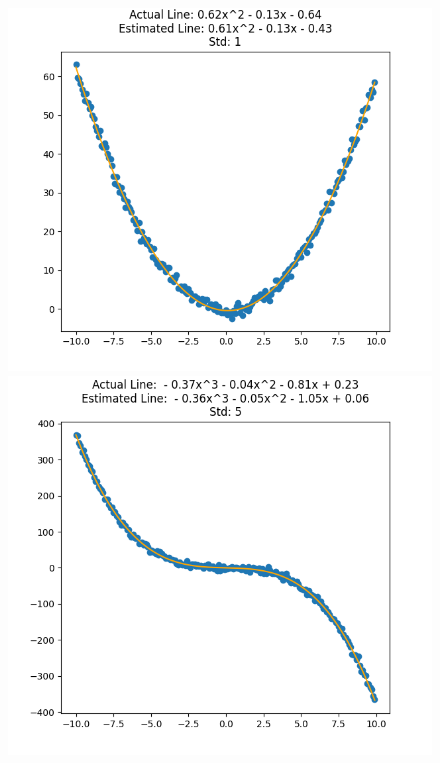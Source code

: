 \documentclass[12pt]{article}
\begin{document}
\begin{figure}[H] 
\centering 
\includegraphics[scale=0.33]{pf1.png}
\includegraphics[scale=0.33]{pf2.png}  

\end{figure}
\end{document}
